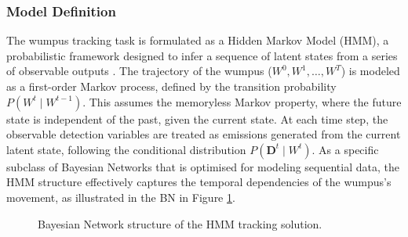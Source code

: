 \documentclass[10pt]{article}
\begin{document}
\subsubsection{Model Definition}
\label{sec:modelDesign}
The wumpus tracking task is formulated as a Hidden Markov Model (HMM), a probabilistic framework 
designed to infer a sequence of latent states from a series of observable outputs \cite{jurafsky2023hmm}. 
The trajectory of the wumpus ($W^0, W^1, \ldots, W^T$) is modeled as a first-order Markov process, 
defined by the transition probability $P(W^t \mid W^{t-1})$. This assumes the memoryless Markov property, 
where the future state is independent of the past, given the current state. At each 
time step, the observable detection variables are treated as emissions generated from the current 
latent state, following the conditional distribution $P(\mathbf{D}^t \mid W^t)$. As a specific 
subclass of Bayesian Networks that is optimised for modeling sequential data, the HMM structure effectively captures the temporal 
dependencies of the wumpus's movement, as illustrated in the BN in Figure \ref{fig: BayesNet}.

\begin{figure}[h]
    \centering
    \caption{Bayesian Network structure of the HMM tracking solution.}
    \label{fig: BayesNet}
\end{figure}
 
\end{document}
